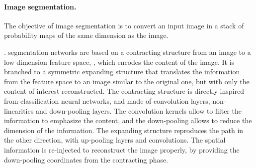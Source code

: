 

\paragraph{Image segmentation.} The objective of image  segmentation is
to convert an input image in a stack of probability maps of the same
dimension as the image. 


.  segmentation networks
are based on a contracting structure from an image to a low dimension
feature space, , which encodes the content of the image. It is branched
to a symmetric expanding structure that translates the information from
the feature space to an image similar to the original one, but with
only the content of interest reconstructed. The contracting structure
is directly inspired from classification neural networks, and made
of convolution layers, non-linearities and down-pooling layers. The
convolution kernels allow to filter the information to emphasize
the content, and the down-pooling allows to reduce the dimension
of the information. The expanding structure reproduces the path in
the other direction, with up-pooling layers and convolutions. The
spatial information is re-injected to reconstruct the image properly,
by providing the down-pooling coordinates from the contracting phase.

